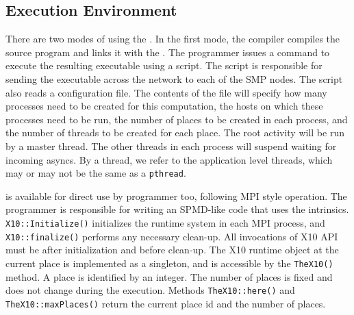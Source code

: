 \subsection{Execution Environment}
There are two modes of using the \Xtenlib{}. In the first mode, the
compiler compiles the \Xten{} source program and links it with the
\Xtenlib{}.  The programmer issues a command to execute the resulting
executable using a script.  The script is responsible for sending the
executable across the network to each of the SMP nodes. The script
also reads a configuration file.  The contents of the file will
specify how many processes need to be created for this computation,
the hosts on which these processes need to be run, the number of
places to be created in each process, and the number of threads to be
created for each place.  The root activity will be run by a master
thread.  The other threads in each process will suspend waiting for
incoming asyncs. By a thread, we refer to the application level
threads, which may or may not be the same as a {\tt pthread}.

\Xtenlib{} is available for direct use by programmer too, following MPI style operation.
The programmer is responsible for writing an SPMD-like code that uses
the \Xtenlib{} intrinsics. {\tt X10::Initialize()} initializes the
runtime system in each MPI process, and {\tt X10::finalize()} performs
any necessary clean-up. All invocations of X10 API must be after
initialization and before clean-up.  The X10 runtime object at the
current place is implemented as a singleton, and is accessible by the
{\tt TheX10()} method.  A place is identified by an integer. The
number of places is fixed and does not change during the
execution. Methods {\tt TheX10::here()} and {\tt TheX10::maxPlaces()}
return the current place id and the number of places.





